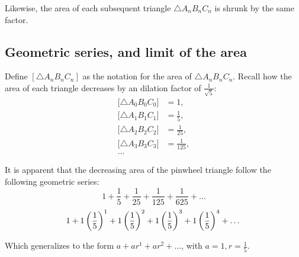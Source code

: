 \noindent
Likewise, the area of each subsequent triangle $\triangle A_{n}B_{n}C_{n}$ is shrunk by the same factor.

\subsection{Geometric series, and limit of the area}
Define $[\triangle A_{n}B_{n}C_{n}]$ as the notation for the area of $\triangle A_{n}B_{n}C_{n}$. Recall how the area of each triangle decreases by an dilation factor of $\frac{1}{\sqrt{5}}$:
\begin{equation}
    \begin{aligned}
        \big[\triangle A_{0}B_{0}C_{0}\big] &= 1,\\
        \big[\triangle A_{1}B_{1}C_{1}\big] &= \frac{1}{5},\\
        \big[\triangle A_{2}B_{2}C_{2}\big] &= \frac{1}{25},\\
        \big[\triangle A_{3}B_{3}C_{3}\big] &= \frac{1}{125},\\
        \ldots
    \end{aligned}
\end{equation}

\noindent
It is apparent that the decreasing area of the pinwheel triangle follow the following geometric series:
\begin{equation}
    1 + \frac{1}{5} + \frac{1}{25} + \frac{1}{125} + \frac{1}{625} + \ldots
\end{equation}
\begin{equation}
    1 + 1\left(\frac{1}{5}\right)^1 + 1\left(\frac{1}{5}\right)^2 + 1\left(\frac{1}{5}\right)^3 + 1\left(\frac{1}{5}\right)^4 + \ldots \\
\end{equation}

\noindent
Which generalizes to the form $a + ar^1 + ar^2 + \ldots$, with $a = 1, r = \frac{1}{5}$.
